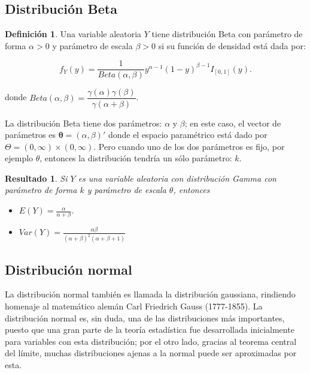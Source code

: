 \documentclass[
  10pt,
  spanish,
]{book}
\providecommand{\tightlist}{%
  \setlength{\itemsep}{0pt}\setlength{\parskip}{0pt}}
\newtheorem{proposition}{Resultado}[chapter]
\theoremstyle{definition}
\newtheorem{definition}{Definición}[chapter]
\theoremstyle{definition}
\theoremstyle{definition}
\theoremstyle{definition}
\theoremstyle{remark}
\begin{document}
\hypertarget{distribuciuxf3n-beta}{%
\subsection{Distribución Beta}\label{distribuciuxf3n-beta}}

\begin{definition}
\protect\hypertarget{def:unnamed-chunk-30}{}{\label{def:unnamed-chunk-30} }Una variable aleatoria \(Y\) tiene distribución Beta con parámetro de forma \(\alpha>0\) y parámetro de escala \(\beta>0\) si su función de densidad está dada por:

\begin{equation}
f_Y(y)=\frac{1}{Beta(\alpha,\beta)}y^{\alpha-1}(1-y)^{\beta-1}I_{[0,1]}(y).
\end{equation}

donde \(Beta(\alpha,\beta)=\dfrac{\gamma(\alpha)\gamma(\beta)}{\gamma(\alpha+\beta)}\).
\end{definition}

La distribución Beta tiene dos parámetros: \(\alpha\) y \(\beta\); en este caso, el vector de parámetros es \(\boldsymbol \theta=(\alpha,\beta)'\) donde el espacio paramétrico está dado por \(\Theta=(0,\infty)\times(0,\infty)\). Pero cuando uno de los dos parámetros es fijo, por ejemplo \(\theta\), entonces la distribución tendría un sólo parámetro: \(k\).

\begin{proposition}
\protect\hypertarget{prp:unnamed-chunk-31}{}{\label{prp:unnamed-chunk-31} }Si \(Y\) es una variable aleatoria con distribución Gamma con parámetro de forma \(k\) y parámetro de escala \(\theta\), entonces

\begin{itemize}
\tightlist
\item
  \(E(Y)=\frac{\alpha}{\alpha + \beta}\).
\item
  \(Var(Y)=\frac{\alpha\beta}{(\alpha+\beta)^2(\alpha+\beta+1)}\)
\end{itemize}
\end{proposition}

\hypertarget{distribuciuxf3n-normal}{%
\subsection{Distribución normal}\label{distribuciuxf3n-normal}}

La distribución normal también es llamada la distribución gaussiana, rindiendo homenaje al matemático alemán Carl Friedrich Gauss (1777-1855). La distribución normal es, sin duda, una de las distribuciones más importantes, puesto que una gran parte de la teoría estadística fue desarrollada inicialmente para variables con esta distribución; por el otro lado, gracias al teorema central del límite, muchas distribuciones ajenas a la normal puede ser aproximadas por esta.
\end{document}
